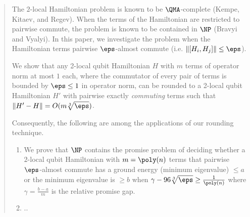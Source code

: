 \begin{abstract}
The $2$-local Hamiltonian problem is known to be $\QMA$-complete (Kempe, Kitaev, and Regev). When the terms of the Hamiltonian are restricted to pairwise commute, the problem is known to be contained in $\NP$ (Bravyi and Vyalyi). In this paper, we investigate the problem when the Hamiltonian terms pairwise $\eps$-almost commute (i.e. $\|[H_{i}, H_{j}]\| \leq \eps$).

We show that any 2-local qubit Hamiltonian $H$ with $m$ terms of operator norm at most $1$ each, where the commutator of every pair of terms is bounded by $\eps \leq 1$ in operator norm, can be rounded to a 2-local qubit Hamiltonian $H'$ with pairwise exactly \emph{commuting} terms such that $\| H' - H \| = O(m \sqrt[3]{\eps})$.

\noindent Consequently, the following are among the applications of our rounding technique.
\begin{enumerate}
    \item We prove that $\NP$ contains the promise problem of deciding whether a $2$-local qubit Hamiltonian with $m = \poly(n)$ terms that pairwise $\eps$-almost commute has a ground energy (minimum eigenvalue) $\leq a$ or the minimum eigenvalue is $\geq b$ when $\gamma - 96 \sqrt[3]{\eps} \geq \frac{1}{\poly(n)}$ where $\gamma = \frac{b-a}{m}$ is the relative promise gap.
    \item ..
\end{enumerate}

\end{abstract}
